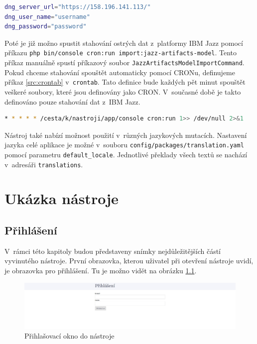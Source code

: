\documentclass[czech,master]{diploma}
\begin{document}
\begin{lstlisting}[language=bash,label=src:env,caption={Část konfiguračního souboru \texttt{.env.local} definující propojení s~IBM Jazz}]
dng_server_url="https://158.196.141.113/"
dng_user_name="username"
dng_password="password"
\end{lstlisting}

Poté je již možno spustit stahování ostrých dat z~platformy IBM Jazz pomocí příkazu \texttt{php bin/console cron:run import:jazz-artifacts-model}. Tento příkaz manuálně spustí příkazový soubor \texttt{JazzArtifactsModelImportCommand}. Pokud chceme stahování spouštět automaticky pomocí CRONu, definujeme příkaz \ref{src:crontab} v~\texttt{crontab}. Tato definice bude každých pět minut spouštět veškeré soubory, které jsou definovány jako CRON. V~současné době je takto definováno pouze stahování dat z~IBM Jazz.

\begin{lstlisting}[language=bash,label=src:crontab,caption={Definice pro automatizaci stahování dat z~IBM Jazz pomocí CRONu}]
* * * * * /cesta/k/nastroji/app/console cron:run 1>> /dev/null 2>&1
\end{lstlisting}

Nástroj také nabízí možnost použití v~různých jazykových mutacích. Nastavení jazyka celé aplikace je možné v~souboru \texttt{config/packages/translation.yaml} pomocí parametru \texttt{default\_locale}. Jednotlivé překlady všech textů se nachází v~adresáři \texttt{translations}.

\chapter{Ukázka nástroje}

\section{Přihlášení}
V~rámci této kapitoly budou představeny snímky nejdůležitějších částí vyvinutého nástroje. První obrazovka, kterou uživatel při otevření nástroje uvidí, je obrazovka pro přihlášení. Tu je možno vidět na obrázku \ref{fig:metrics_tool_login}.

\begin{figure}[!ht]
    \centering
    \includegraphics[width=1\textwidth]{Diplomka/Figures/metrics_tool/login.jpg}
    \caption{Přihlašovací okno do nástroje}
    \label{fig:metrics_tool_login}
\end{figure}
\end{document}
